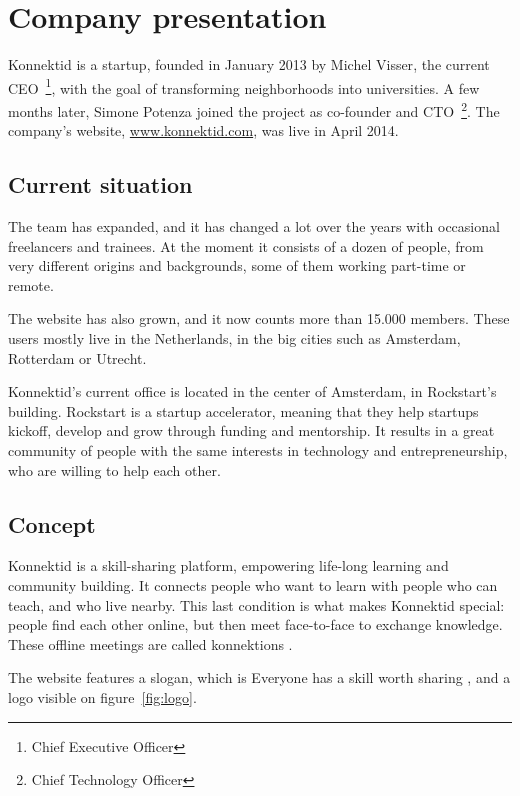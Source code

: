 \section{Company presentation}
\label{sec:company}

Konnektid is a startup, founded in January 2013 by Michel {\sc Visser}, the current CEO~\footnote{Chief Executive Officer},
with the goal of transforming neighborhoods into universities. A few months later, Simone {\sc Potenza} joined the project
as co-founder and CTO~\footnote{Chief Technology Officer}. The company's website, \url{www.konnektid.com}, was live in April 2014.

\subsection{Current situation}
\label{ssec:situation}

The team has expanded, and it has changed a lot over the years with occasional freelancers and trainees.
At the moment it consists of a dozen of people, from very different origins and backgrounds, some of them working part-time or remote.

The website has also grown, and it now counts more than 15.000 members.
These users mostly live in the Netherlands, in the big cities such as Amsterdam, Rotterdam or Utrecht.

Konnektid's current office is located in the center of Amsterdam, in Rockstart's building.
Rockstart is a startup accelerator, meaning that they help startups kickoff, develop and grow through funding and mentorship.
It results in a great community of people with the same interests in technology and entrepreneurship, who are willing to help each other.

\subsection{Concept}
\label{ssec:concept}

Konnektid is a skill-sharing platform, empowering life-long learning and community building. It connects people who want to learn with people who can teach, and who live nearby.
This last condition is what makes Konnektid special: people find each other online, but then meet face-to-face to exchange knowledge.
These offline meetings are called \guillemotleft{} konnektions \guillemotright{}.

The website features a slogan, which is \guillemotleft{} Everyone has a skill worth sharing \guillemotright{},
and a logo visible on {\sc figure}~\ref{fig:logo}.
\vspace{1cm}

